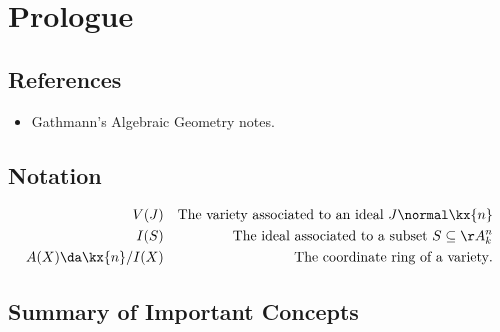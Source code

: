 \newpage

\tableofcontents
\newpage

\hypertarget{prologue}{%
\section*{Prologue}\label{prologue}}

\hypertarget{references}{%
\subsection{References}\label{references}}

\begin{itemize}
\tightlist
\item
  Gathmann's Algebraic Geometry notes\autocite{AndreasGathmann515}.
\end{itemize}

\hypertarget{notation}{%
\subsection{Notation}\label{notation}}

\begin{align*}
V(J)                   && \text{The variety associated to an ideal } J \normal \kx{n} \\
I(S)                   && \text{The ideal associated to a subset } S \subseteq \AA^n_{k} \\
A(X) \da \kx{n} / I(X) && \text{The coordinate ring of a variety}
.\end{align*}


\hypertarget{summary-of-important-concepts}{%
\subsection{Summary of Important
Concepts}\label{summary-of-important-concepts}}

